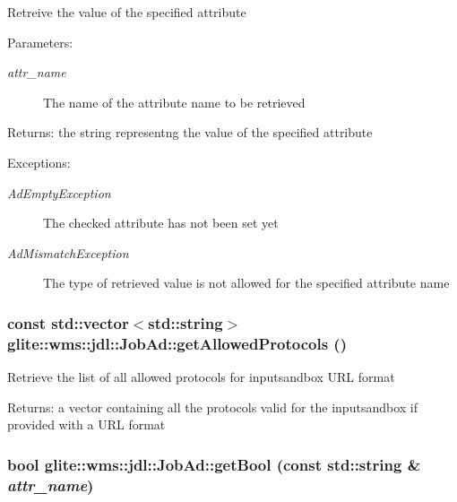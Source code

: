 Retreive the value of the specified attribute \begin{Desc}
\item[Parameters:]
\begin{description}
\item[{\em attr\_\-name}]The name of the attribute name to be retrieved \end{description}
\end{Desc}
\begin{Desc}
\item[Returns:]the string representng the value of the specified attribute \end{Desc}
\begin{Desc}
\item[Exceptions:]
\begin{description}
\item[{\em Ad\-Empty\-Exception}]The checked attribute has not been set yet \item[{\em Ad\-Mismatch\-Exception}]The type of retrieved value is not allowed for the specified attribute name \end{description}
\end{Desc}
\hypertarget{classglite_1_1wms_1_1jdl_1_1JobAd_z5_3}{
\subsubsection[getAllowedProtocols]{\setlength{\rightskip}{0pt plus 5cm}const std::vector$<$std::string$>$ glite::wms::jdl::Job\-Ad::get\-Allowed\-Protocols ()}}
\label{classglite_1_1wms_1_1jdl_1_1JobAd_z5_3}


Retrieve the list of all allowed protocols for inputsandbox URL format \begin{Desc}
\item[Returns:]a vector containing all the protocols valid for the inputsandbox if provided with a URL format\end{Desc}
\hypertarget{classglite_1_1wms_1_1jdl_1_1JobAd_z7_4}{
\subsubsection[getBool]{\setlength{\rightskip}{0pt plus 5cm}bool glite::wms::jdl::Job\-Ad::get\-Bool (const std::string \& {\em attr\_\-name})}}
\label{classglite_1_1wms_1_1jdl_1_1JobAd_z7_4}


